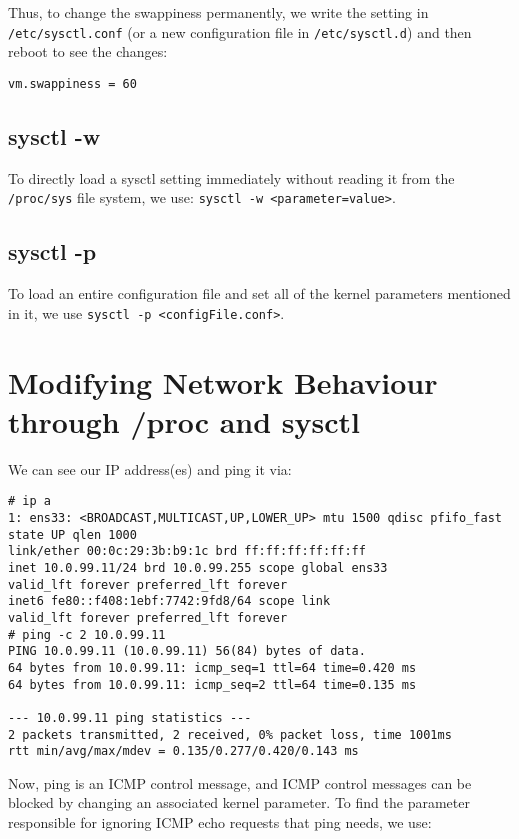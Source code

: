 \noindent
Thus, to change the swappiness permanently, we write the setting in \verb|/etc/sysctl.conf| (or a new configuration file in \verb|/etc/sysctl.d|) and then reboot to see the changes: 

\vspace{-15pt}
\begin{verbatim}
vm.swappiness = 60
\end{verbatim}
\vspace{-10pt}	

\subsection{sysctl -w}
To directly load a sysctl setting immediately without reading it from the \verb|/proc/sys| file system, we use: \verb|sysctl -w <parameter=value>|.

\subsection{sysctl -p}
To load an entire configuration file and set all of the kernel parameters mentioned in it, we use \verb|sysctl -p <configFile.conf>|.

	\section{Modifying Network Behaviour through /proc and sysctl}
We can see our IP address(es) and ping it via:

\vspace{-15pt}
\begin{verbatim}
# ip a
1: ens33: <BROADCAST,MULTICAST,UP,LOWER_UP> mtu 1500 qdisc pfifo_fast state UP qlen 1000
link/ether 00:0c:29:3b:b9:1c brd ff:ff:ff:ff:ff:ff
inet 10.0.99.11/24 brd 10.0.99.255 scope global ens33
valid_lft forever preferred_lft forever
inet6 fe80::f408:1ebf:7742:9fd8/64 scope link 
valid_lft forever preferred_lft forever
# ping -c 2 10.0.99.11
PING 10.0.99.11 (10.0.99.11) 56(84) bytes of data.
64 bytes from 10.0.99.11: icmp_seq=1 ttl=64 time=0.420 ms
64 bytes from 10.0.99.11: icmp_seq=2 ttl=64 time=0.135 ms

--- 10.0.99.11 ping statistics ---
2 packets transmitted, 2 received, 0% packet loss, time 1001ms
rtt min/avg/max/mdev = 0.135/0.277/0.420/0.143 ms
\end{verbatim}
\vspace{-10pt}	

\noindent
Now, ping is an ICMP control message, and ICMP control messages can be blocked by changing an associated kernel parameter. To find the parameter responsible for ignoring ICMP echo requests that ping needs, we use:

